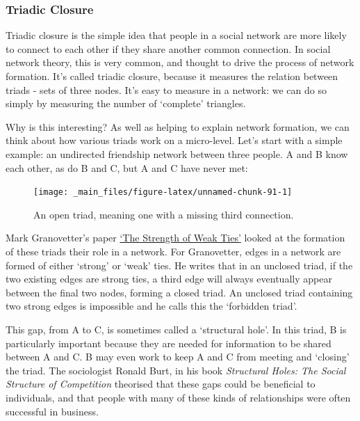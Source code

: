 \documentclass[
]{book}
\begin{document}
\hypertarget{triadic-closure}{%
\subsubsection{Triadic Closure}\label{triadic-closure}}

Triadic closure is the simple idea that people in a social network are more likely to connect to each other if they share another common connection. In social network theory, this is very common, and thought to drive the process of network formation. It's called triadic closure, because it measures the relation between triads - sets of three nodes. It's easy to measure in a network: we can do so simply by measuring the number of `complete' triangles.

Why is this interesting? As well as helping to explain network formation, we can think about how various triads work on a micro-level. Let's start with a simple example: an undirected friendship network between three people. A and B know each other, as do B and C, but A and C have never met:

\begin{figure}

{\centering \texttt{[image: \_main\_files/figure-latex/unnamed-chunk-91-1]} 

}

\caption{An open triad, meaning one with a missing third connection.}\label{fig:unnamed-chunk-91}
\end{figure}

Mark Granovetter's paper \href{https://www.jstor.org/stable/2776392}{`The Strength of Weak Ties'} looked at the formation of these triads their role in a network. For Granovetter, edges in a network are formed of either `strong' or `weak' ties. He writes that in an unclosed triad, if the two existing edges are strong ties, a third edge will always eventually appear between the final two nodes, forming a closed triad. An unclosed triad containing two strong edges is impossible and he calls this the `forbidden triad'.

This gap, from A to C, is sometimes called a `structural hole'. In this triad, B is particularly important because they are needed for information to be shared between A and C. B may even work to keep A and C from meeting and `closing' the triad. The sociologist Ronald Burt, in his book \emph{Structural Holes: The Social Structure of Competition} theorised that these gaps could be beneficial to individuals, and that people with many of these kinds of relationships were often successful in business.
\end{document}
